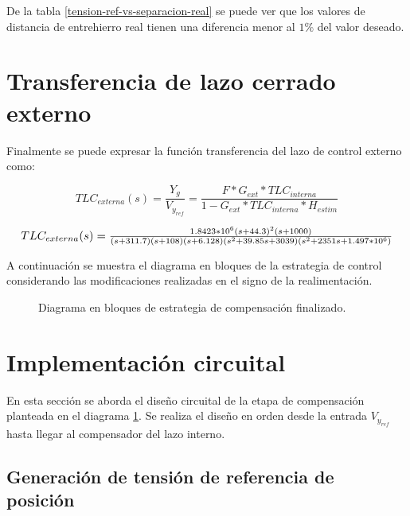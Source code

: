 De la tabla \ref{tension-ref-vs-separacion-real} se puede ver que los valores de distancia de entrehierro real tienen una diferencia menor al $1\%$ del valor deseado.



\section{Transferencia de lazo cerrado externo}

Finalmente se puede expresar la función transferencia del lazo de control externo como:

\begin{equation}
	TLC_{externa}(s)=\frac{Y_g}{V_{y_{ref}}}=\frac{F*G_{ext}*TLC_{interna}}{1-G_{ext}*TLC_{interna}*H_{estim}}
\end{equation}

\begin{equation*}
\resizebox{.99\hsize}{!}
{
$
TLC_{externa}(s)=\frac{1.8423*10^6 (s+44.3)^2 (s+1000)}{(s+311.7) (s+108) (s+6.128) (s^2 + 39.85s + 3039) (s^2 + 2351s + 1.497*10^6 )}
$
}
\end{equation*}

A continuación se muestra el diagrama en bloques de la estrategia de control considerando las modificaciones realizadas en el signo de la realimentación.

\begin{figure}[H]
	\centering
	\scalebox{0.8}{}
	\caption{Diagrama en bloques de estrategia de compensación finalizado.}	\label{fig:diag-en-bloques-comp_final}
\end{figure}

\section{Implementación circuital}

En esta sección se aborda el diseño circuital de la etapa de compensación planteada en el diagrama \ref{fig:diag-en-bloques-comp_final}. Se realiza el diseño en orden desde la entrada $V_{y_{ref}}$ hasta llegar al compensador del lazo interno.

\subsection{Generación de tensión de referencia de posición}

